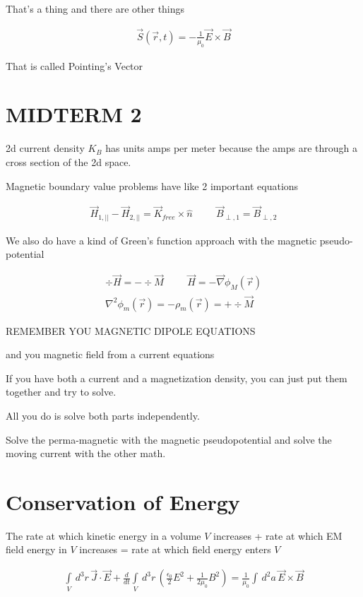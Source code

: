 \documentclass[fleqn]{report}
\newcommand{\hp}{\hspace{1cm}}
\newcommand{\del}{\partial}
\newcommand{\equations} [1] {
\begin{gather*}
#1
\end{gather*}
}
\begin{document}
That's a thing and there are other things 
\equations{
    \vec S(\vec r, t)
    =
    - \frac{1}{\mu_0}
    \vec E \times \vec B 
}

That is called Pointing's Vector 



\section{MIDTERM 2}
2d current density $K_B$ has units amps per meter because the amps are 
through a cross section of the 2d space. 

Magnetic boundary value problems have like 2 important equations
\equations{
    \vec H_{1, ||}
    -
    \vec H_{2, ||}
    =
    \vec K_{free}
    \times 
    \hat n
    \hp 
    \vec B_{\perp, 1}
    =
    \vec B_{\perp, 2}
}

We also do have a kind of Green's function approach 
with the magnetic pseudo-potential 
\equations{
    \div \vec H 
    =
    - 
    \div \vec M 
    \hp 
    \vec H 
    =
    - \vec \nabla \phi_M(\vec r)
    \\
    \nabla^2 \phi_m(\vec r)
    =
    - \rho_m(\vec r)
    =
    + \div \vec M 
}


REMEMBER YOU MAGNETIC DIPOLE EQUATIONS

and you magnetic field from a current equations 

If you have both a current and a magnetization density, 
you can just put them together and try to solve. 

All you do is solve both parts independently. 

Solve the perma-magnetic with the magnetic pseudopotential and solve 
the moving current with the other math. 

\section{Conservation of Energy}
The rate at which kinetic energy in a volume $V$ increases 
+
rate at which EM field energy in $V$ increases 
=
rate at which field energy enters $V$

\equations{
    \int\limits_V \, d^3 r \, 
    \vec J \cdot \vec E
    +
    \frac{d}{dt}
    \int\limits_V \, d^3 r \, 
    \left(
        \frac{\epsilon_0}{2} E^2 
        + 
        \frac{1}{2 \mu_0}
        B^2
    \right)
    =
    \frac{1}{\mu_0}
    \int \, d^2 a \, 
    \vec E \times \vec B
}
\end{document}
